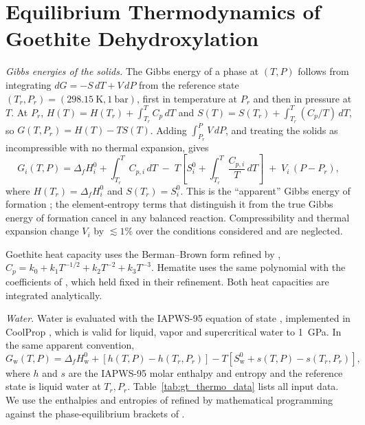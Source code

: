 \section{Equilibrium Thermodynamics of Goethite Dehydroxylation}
\label{sec:eqm-thermo}

\textit{Gibbs energies of the solids.} The Gibbs energy of a phase at $(T,P)$ follows from
integrating $dG = -S\,dT + V\,dP$ from the reference state $(T_r,P_r) = (298.15~\mathrm{K}, 1~\mathrm{bar})$,
first in temperature at $P_r$ and then in pressure at $T$. At $P_r$,
$H(T) = H(T_r) + \int_{T_r}^{T}C_p\,dT$ and $S(T) = S(T_r) + \int_{T_r}^{T}(C_p/T)\,dT$, so
$G(T,P_r) = H(T) - T S(T)$. Adding $\int_{P_r}^{P}V\,dP$, and treating the solids as incompressible
with no thermal expansion, gives
\begin{equation}
  G_i(T,P) = \Delta_f H_i^{0} + \int_{T_r}^{T} C_{p,i}\,dT
  \;-\; T\left[S_i^{0} + \int_{T_r}^{T}\frac{C_{p,i}}{T}\,dT\right]
  \;+\; V_i\,(P-P_r),
  \label{eq:gt_Gsolid}
\end{equation}
where $H(T_r) = \Delta_f H_i^{0}$ and $S(T_r) = S_i^{0}$. This is the ``apparent'' Gibbs energy of
formation \citep{berman1988}; the element-entropy terms that distinguish it from the true Gibbs
energy of formation cancel in any balanced reaction. Compressibility and thermal expansion change
$V_i$ by $\lesssim1\%$ over the conditions considered and are neglected.

Goethite heat capacity uses the Berman--Brown form \citep{berman1985} refined by
\citet{majzlan2003}, $C_p = k_0 + k_1 T^{-1/2} + k_2 T^{-2} + k_3 T^{-3}$. Hematite uses the same
polynomial with the coefficients of \citet{berman1988}, which \citet{majzlan2003} held fixed in their
refinement. Both heat capacities are integrated analytically.

\textit{Water.} Water is evaluated with the IAPWS-95 equation of state \citep{wagner2002},
implemented in CoolProp \citep{bell2014}, which is valid for liquid, vapor and supercritical
water to 1~GPa. In the same apparent convention,
\begin{equation}
  G_{\mathrm{w}}(T,P) = \Delta_f H_{\mathrm{w}}^{0} + \left[h(T,P) - h(T_r,P_r)\right]
  - T\left[S_{\mathrm{w}}^{0} + s(T,P) - s(T_r,P_r)\right],
  \label{eq:gt_Gw}
\end{equation}
where $h$ and $s$ are the IAPWS-95 molar enthalpy and entropy and the reference state is liquid
water at $T_r,P_r$. Table~\ref{tab:gt_thermo_data} lists all
input data. We use the enthalpies and entropies of \citet{majzlan2003} refined by mathematical
programming against the phase-equilibrium brackets of \citet{voigt1981}.

